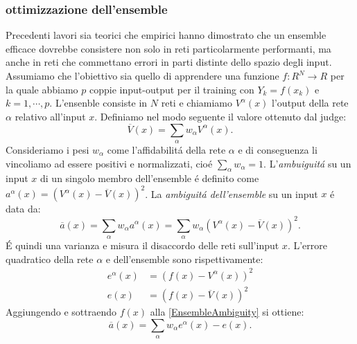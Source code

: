\documentclass[a4paper,10pt]{article}
\begin{document}
 \subsubsection{ottimizzazione dell'ensemble}
  Precedenti lavori sia teorici \cite{hansen1990neural} \cite{krogh1995neural} che empirici \cite{hashem1994optimal} \cite{maclin1995combining} hanno dimostrato che un ensemble efficace dovrebbe consistere non solo in reti particolarmente performanti, ma anche in reti che commettano errori in parti distinte dello spazio degli input. 
  Assumiamo che l'obiettivo sia quello di apprendere una funzione $f:R^N\to R$ per la quale abbiamo $p$ coppie input-output per il training con $Y_k = f \left( x_k \right) $ e $k=1, \cdots , p$. L'ensenble consiste in $N$ reti e chiamiamo $V^{\alpha}\left( x\right)$ l'output della rete $\alpha$ relativo all'input $x$. Definiamo nel modo seguente il valore ottenuto dal judge: 
  \begin{equation}
   \overline{V}\left(x\right) = \sum_{\alpha} w_{\alpha} V^{\alpha}\left(x\right).
  \end{equation}
  Consideriamo i pesi $w_{\alpha}$ come l'affidabilit\'a della rete $\alpha$ e di conseguenza li vincoliamo ad essere positivi e normalizzati, cio\'e $\sum_{\alpha} w_{\alpha} = 1$. L'\textit{ambuiguit\'a} su un input $x$ di un singolo membro dell'ensemble \'e definito come $a^{\alpha}\left(x\right)=\left(V^{\alpha}\left(x\right)-\overline{V}\left(x\right)\right)^2$. La \textit{ambiguit\'a dell'ensemble} su un input $x$ \'e data da:
  \begin{equation}
   \overline{a}\left(x\right) = \sum_{\alpha} w_{\alpha} a^{\alpha}\left(x\right) = \sum_{\alpha} w_{\alpha}\left(V^{\alpha}\left(x\right)-\overline{V}\left(x\right)\right)^2. \label{EnsembleAmbiguity}
  \end{equation}
  \'E quindi una varianza e misura il disaccordo delle reti sull'input $x$. L'errore quadratico della rete $\alpha$ e dell'ensemble sono rispettivamente:
  \begin{align}
   e^{\alpha}\left(x\right) &= \left(f\left(x\right)-V^{\alpha}\left(x\right)\right)^2 \\
   e\left(x\right) &= \left(f\left(x\right)-\overline{V}\left(x\right)\right)^2 \label{ensembleQE}
  \end{align}
  Aggiungendo e sottraendo $f\left(x\right)$ alla \ref{EnsembleAmbiguity} si ottiene:
  \begin{equation}
   \overline{a}\left(x\right) = \sum_{\alpha} w_{\alpha} e^{\alpha}\left(x\right) - e\left(x\right).
  \end{equation}
\end{document}
